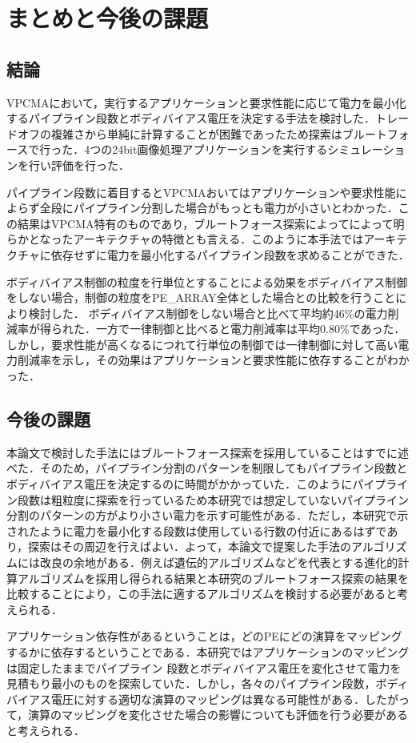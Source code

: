 \chapter{まとめと今後の課題}
{
\label{chap:conclusion}
\section{結論}
\label{sec:conclusion}
VPCMAにおいて，実行するアプリケーションと要求性能に応じて電力を最小化するパイプライン段数とボディバイアス電圧を決定する手法を検討した．トレードオフの複雑さから単純に計算することが困難であったため探索はブルートフォースで行った．4つの24bit画像処理アプリケーションを実行するシミュレーションを行い評価を行った．

パイプライン段数に着目するとVPCMAおいてはアプリケーションや要求性能によらず全段にパイプライン分割した場合がもっとも電力が小さいとわかった．この結果はVPCMA特有のものであり，ブルートフォース探索によってによって明らかとなったアーキテクチャの特徴とも言える．このように本手法ではアーキテクチャに依存せずに電力を最小化するパイプライン段数を求めることができた．

ボディバイアス制御の粒度を行単位とすることによる効果をボディバイアス制御をしない場合，制御の粒度をPE\_ARRAY全体とした場合との比較を行うことにより検討した．
ボディバイアス制御をしない場合と比べて平均約46\%の電力削減率が得られた．一方で一律制御と比べると電力削減率は平均0.80\%であった．しかし，要求性能が高くなるにつれて行単位の制御では一律制御に対して高い電力削減率を示し，その効果はアプリケーションと要求性能に依存することがわかった．

\section{今後の課題}
\label{sec:future}

本論文で検討した手法にはブルートフォース探索を採用していることはすでに述べた．そのため，パイプライン分割のパターンを制限してもパイプライン段数とボディバイアス電圧を決定するのに時間がかかっていた．このようにパイプライン段数は粗粒度に探索を行っているため本研究では想定していないパイプライン分割のパターンの方がより小さい電力を示す可能性がある．ただし，本研究で示されたように電力を最小化する段数は使用している行数の付近にあるはずであり，探索はその周辺を行えばよい．よって，本論文で提案した手法のアルゴリズムには改良の余地がある．例えば遺伝的アルゴリズムなどを代表とする進化的計算アルゴリズムを採用し得られる結果と本研究のブルートフォース探索の結果を比較することにより，この手法に適するアルゴリズムを検討する必要があると考えられる．

アプリケーション依存性があるということは，どのPEにどの演算をマッピングするかに依存するということである．本研究ではアプリケーションのマッピングは固定したままでパイプライン
段数とボディバイアス電圧を変化させて電力を見積もり最小のものを探索していた．しかし，各々のパイプライン段数，ボディバイアス電圧に対する適切な演算のマッピングは異なる可能性がある．したがって，演算のマッピングを変化させた場合の影響についても評価を行う必要があると考えられる．
}
